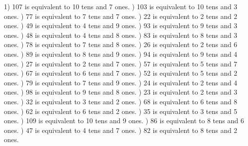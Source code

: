 \documentclass{article}%
\begin{document}
1) 107 is equivalent to  10 tens and 7 ones.%
) 103 is equivalent to  10 tens and 3 ones.%
) 77 is equivalent to  7 tens and 7 ones.%
) 22 is equivalent to  2 tens and 2 ones.%
) 49 is equivalent to  4 tens and 9 ones.%
) 93 is equivalent to  9 tens and 3 ones.%
) 48 is equivalent to  4 tens and 8 ones.%
) 83 is equivalent to  8 tens and 3 ones.%
) 78 is equivalent to  7 tens and 8 ones.%
) 26 is equivalent to  2 tens and 6 ones.%
) 89 is equivalent to  8 tens and 9 ones.%
) 94 is equivalent to  9 tens and 4 ones.%
) 27 is equivalent to  2 tens and 7 ones.%
) 57 is equivalent to  5 tens and 7 ones.%
) 67 is equivalent to  6 tens and 7 ones.%
) 52 is equivalent to  5 tens and 2 ones.%
) 79 is equivalent to  7 tens and 9 ones.%
) 24 is equivalent to  2 tens and 4 ones.%
) 98 is equivalent to  9 tens and 8 ones.%
) 23 is equivalent to  2 tens and 3 ones.%
) 32 is equivalent to  3 tens and 2 ones.%
) 68 is equivalent to  6 tens and 8 ones.%
) 62 is equivalent to  6 tens and 2 ones.%
) 35 is equivalent to  3 tens and 5 ones.%
) 109 is equivalent to  10 tens and 9 ones.%
) 86 is equivalent to  8 tens and 6 ones.%
) 47 is equivalent to  4 tens and 7 ones.%
) 82 is equivalent to  8 tens and 2 ones.%
\end{document}
